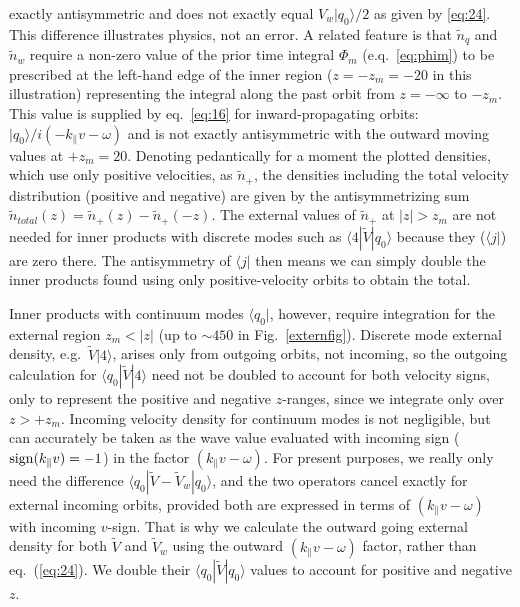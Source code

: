 \documentclass[12pt]{article}
\def\ket#1{|#1\rangle}
\def\bra#1{\langle#1}
\begin{document}
exactly antisymmetric and does not exactly equal $V_w\ket{q_0}/2$ as
given by \ref{eq:24}. This difference illustrates physics, not an
error. A related feature is that $\tilde n_q$ and $\tilde n_w$ require
a non-zero value of the prior time integral $\Phi_m$ (e.q.\
\ref{eq:phim}) to be prescribed at the left-hand edge of the inner
region ($z=-z_m=-20$ in this illustration) representing the integral
along the past orbit from $z=-\infty$ to $-z_m$. This value is supplied
by eq.\ \ref{eq:16} for inward-propagating orbits:
$\ket{q_0}/i(-k_\parallel v -\omega)$ and is not exactly antisymmetric
with the outward moving values at $+z_m=20$. Denoting pedantically for
a moment the plotted densities, which use only positive velocities, as
$\tilde n_+$, the densities including the total velocity distribution
(positive and negative) are given by the antisymmetrizing sum
$\tilde n_{total}(z)=\tilde n_+(z)-\tilde n_+(-z)$. The external
values of $\tilde n_+$ at $|z|>z_m$ are not needed for inner products
with discrete modes such as $\bra{4}|\tilde V\ket{q_0}$ because they
($\bra{j}|$) are zero there. The antisymmetry of $\bra{j}|$ then means
we can simply double the inner products found using only
positive-velocity orbits to obtain the total.

Inner products with continuum modes $\bra{q_0}|$, however, require
integration for the external region $z_m<|z|$ (up to $\sim 450$ in
Fig.\ \ref{externfig}). Discrete mode external density, e.g.\
$\tilde V \ket{4}$, arises only from outgoing orbits, not incoming, so
the outgoing calculation for $\bra{q_0}|\tilde V\ket{4}$ need not be
doubled to account for both velocity signs, only to represent the
positive and negative $z$-ranges, since we integrate only over
$z>+z_m$. Incoming velocity density for continuum modes is not
negligible, but can accurately be taken as the wave value evaluated
with incoming sign (${\rm sign}(k_\parallel v)=-1$) in the factor
$(k_\parallel v-\omega)$.  \iffalse Thus, incoming density in the
outer region is equal to outgoing times the factor
$R=\int_0^\infty (k_\parallel v-\omega)/(-k_\parallel v-\omega)\;
f_\infty(v)dv$, and the total external contribution to
$\bra{q_0}|\tilde V\ket{q_0}$ is $1+R$ times the outgoing.  \fi For
present purposes, we really only need the difference
$\bra{q_0}|\tilde V-\tilde V_w\ket{q_0}$, and the two operators cancel
exactly for external incoming orbits, provided both are expressed in
terms of $(k_\parallel v-\omega)$ with incoming $v$-sign.  That is why
we calculate the outward going external density for both $\tilde V$
and $\tilde V_w$ using the outward $(k_\parallel v-\omega)$ factor,
rather than eq.\ (\ref{eq:24}). We double their
$\bra{q_0}|\tilde V\ket{q_0}$ values to account for positive and
negative $z$.
\end{document}
